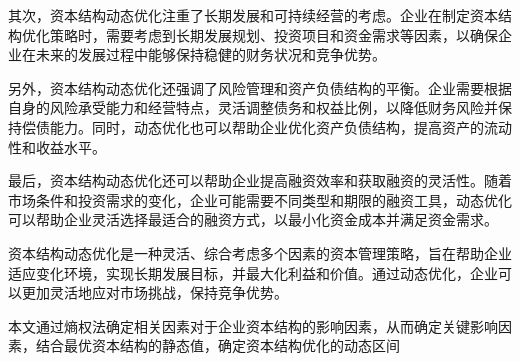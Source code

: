 其次，资本结构动态优化注重了长期发展和可持续经营的考虑。企业在制定资本结构优化策略时，需要考虑到长期发展规划、投资项目和资金需求等因素，以确保企业在未来的发展过程中能够保持稳健的财务状况和竞争优势。\cite{Meng2020}

另外，资本结构动态优化还强调了风险管理和资产负债结构的平衡。企业需要根据自身的风险承受能力和经营特点，灵活调整债务和权益比例，以降低财务风险并保持偿债能力。同时，动态优化也可以帮助企业优化资产负债结构，提高资产的流动性和收益水平。

最后，资本结构动态优化还可以帮助企业提高融资效率和获取融资的灵活性。随着市场条件和投资需求的变化，企业可能需要不同类型和期限的融资工具，动态优化可以帮助企业灵活选择最适合的融资方式，以最小化资金成本并满足资金需求。

资本结构动态优化是一种灵活、综合考虑多个因素的资本管理策略，旨在帮助企业适应变化环境，实现长期发展目标，并最大化利益和价值。通过动态优化，企业可以更加灵活地应对市场挑战，保持竞争优势。

本文通过熵权法确定相关因素对于企业资本结构的影响因素，从而确定关键影响因素，结合最优资本结构的静态值，确定资本结构优化的动态区间   